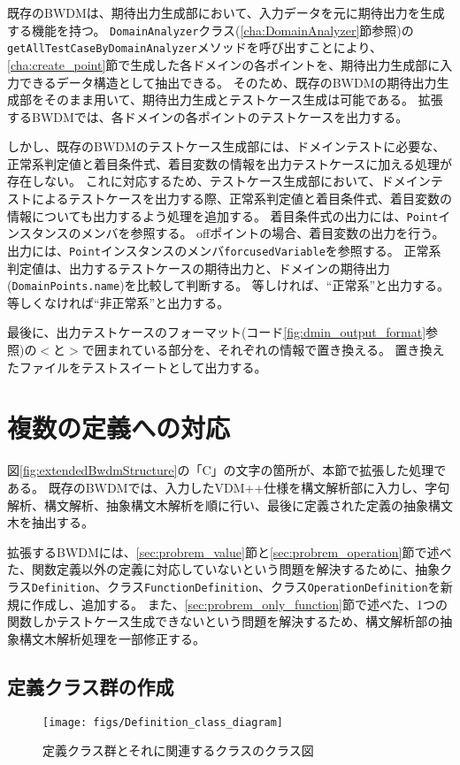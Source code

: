 \documentclass[uplatex, report, a4j, 10pt]{jsbook}
\newcommand\ttt[1]{\texttt{#1}}
\begin{document}
既存のBWDMは、期待出力生成部において、入力データを元に期待出力を生成する機能を持つ。
\ttt{DomainAnalyzer}クラス(\ref{cha:DomainAnalyzer}節参照)の\ttt{getAllTestCaseByDomainAnalyzer}メソッドを呼び出すことにより、\ref{cha:create_point}節で生成した各ドメインの各ポイントを、期待出力生成部に入力できるデータ構造として抽出できる。
そのため、既存のBWDMの期待出力生成部をそのまま用いて、期待出力生成とテストケース生成は可能である。
拡張するBWDMでは、各ドメインの各ポイントのテストケースを出力する。

しかし、既存のBWDMのテストケース生成部には、ドメインテストに必要な、正常系判定値と着目条件式、着目変数の情報を出力テストケースに加える処理が存在しない。
これに対応するため、テストケース生成部において、ドメインテストによるテストケースを出力する際、正常系判定値と着目条件式、着目変数の情報についても出力するよう処理を追加する。
着目条件式の出力には、\ttt{Point}インスタンスのメンバ\forcusedConditionalExpression{}を参照する。
offポイントの場合、着目変数の出力を行う。出力には、\ttt{Point}インスタンスのメンバ\ttt{forcusedVariable}を参照する。
正常系判定値は、出力するテストケースの期待出力と、ドメインの期待出力(\ttt{DomainPoints.name})を比較して判断する。
等しければ、``正常系''と出力する。等しくなければ``非正常系''と出力する。

最後に、出力テストケースのフォーマット(コード\ref{fig:dmin_output_format}参照)の$<$と$>$で囲まれている部分を、それぞれの情報で置き換える。
置き換えたファイルをテストスイートとして出力する。

\section{複数の定義への対応}\label{sec:extendMultiple}
図\ref{fig:extendedBwdmStructure}の「C」の文字の箇所が、本節で拡張した処理である。
既存のBWDMでは、入力したVDM++仕様を構文解析部に入力し、字句解析、構文解析、抽象構文木解析を順に行い、最後に定義された定義の抽象構文木を抽出する。

拡張するBWDMには、\ref{sec:probrem_value}節と\ref{sec:probrem_operation}節で述べた、関数定義以外の定義に対応していないという問題を解決するために、抽象クラス\ttt{Definition}、クラス\ttt{FunctionDefinition}、クラス\ttt{OperationDefinition}を新規に作成し、追加する。
また、\ref{sec:probrem_only_function}節で述べた、1つの関数しかテストケース生成できないという問題を解決するため、構文解析部の抽象構文木解析処理を一部修正する。

\subsection{定義クラス群の作成}\label{sec:create_definition}
\begin{figure}[tp]
  \centering
  \texttt{[image: figs/Definition\_class\_diagram]}
  \caption{定義クラス群とそれに関連するクラスのクラス図}
  \label{fig:definition_class}
\end{figure}
\end{document}
